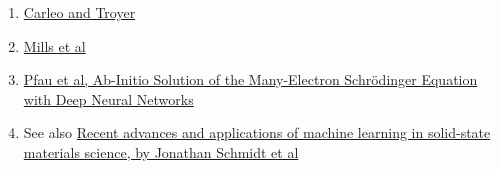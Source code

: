 \documentclass[%
oneside,                 %
final,                   %
10pt]{article}
\begin{document}
\begin{enumerate}
\item \href{{http://science.sciencemag.org/content/355/6325/602}}{Carleo and Troyer} 

\item \href{{https://journals.aps.org/pra/abstract/10.1103/PhysRevA.96.042113}}{Mills et al} 

\item \href{{https://arxiv.org/abs/1909.02487}}{Pfau et al, Ab-Initio Solution of the Many-Electron Schrödinger Equation with Deep Neural Networks}

\item See also \href{{https://www.nature.com/articles/s41524-019-0221-0}}{Recent advances and applications of machine learning in solid-state materials science, by  Jonathan Schmidt et al}
\end{enumerate}

\noindent


\end{document}
